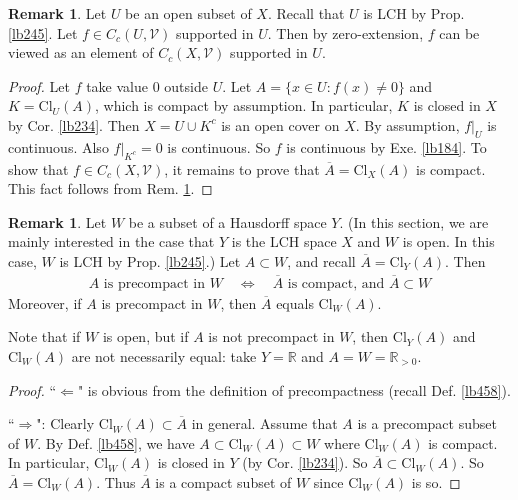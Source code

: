 \documentclass[12pt,b5paper,notitlepage]{article}
\theoremstyle{definition}
\newtheorem{rem}[df]{Remark}
\theoremstyle{plain}
\newcommand{\mc}{\mathcal}
\newcommand{\ovl}{\overline}
\newcommand{\Rbb}{\mathbb R}
\newcommand{\Cl}{\mathrm{Cl}}
\numberwithin{equation}{section}
\begin{document}
\begin{rem}\label{lb457}
Let $U$ be an open subset of $X$. Recall that $U$ is LCH by Prop. \ref{lb245}. Let $f\in C_c(U,\mc V)$ supported in $U$. Then by zero-extension, $f$ can be viewed as an element of $C_c(X,\mc V)$ supported in $U$. 
\end{rem}


\begin{proof}
Let $f$ take value $0$ outside $U$. Let  $A=\{x\in U:f(x)\neq 0\}$ and $K=\Cl_U(A)$, which is compact by assumption. In particular, $K$ is closed in $X$ by Cor. \ref{lb234}. Then $X=U\cup K^c$ is an open cover on $X$. By assumption, $f|_U$ is continuous. Also $f|_{K^c}=0$ is continuous. So $f$ is continuous by Exe. \ref{lb184}. To show that $f\in C_c(X,\mc V)$, it remains to prove that $\ovl A=\Cl_X(A)$ is compact. This fact follows from Rem. \ref{lb459}.
\end{proof}



\begin{rem}\label{lb459}
Let $W$ be a subset of a Hausdorff space $Y$. (In this section, we are mainly interested in the case that $Y$ is the LCH space $X$ and $W$ is open. In this case, $W$ is LCH by Prop. \ref{lb245}.)  Let $A\subset W$, and recall $\ovl A=\Cl_Y(A)$. Then 
\begin{align}\label{eq196}
A\text{ is precompact in }W\quad\Longleftrightarrow\quad \ovl A\text{ is compact, and }\ovl A\subset W
\end{align}
Moreover, if $A$ is precompact in $W$, then $\ovl A$ equals $\Cl_W(A)$.
\end{rem}

Note that if $W$ is open, but if $A$ is not precompact in $W$, then $\Cl_Y(A)$ and $\Cl_W(A)$ are not necessarily equal: take $Y=\Rbb$ and $A=W=\Rbb_{>0}$.

\begin{proof}
``$\Leftarrow$" is obvious from the definition of precompactness (recall Def. \ref{lb458}).

``$\Rightarrow$": Clearly $\Cl_W(A)\subset\ovl A$ in general. Assume that $A$ is a precompact subset of $W$. By Def. \ref{lb458}, we have $A\subset\Cl_W(A)\subset W$ where $\Cl_W(A)$ is compact. In particular, $\Cl_W(A)$ is closed in $Y$ (by Cor. \ref{lb234}). So $\ovl A\subset\Cl_W(A)$. So $\ovl A=\Cl_W(A)$. Thus $\ovl A$ is a compact subset of $W$ since $\Cl_W(A)$ is so.
\end{proof}
\end{document}
